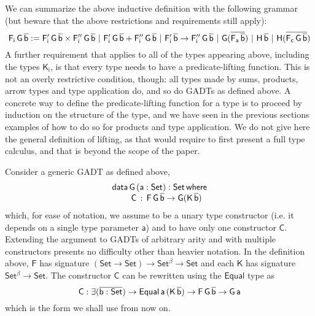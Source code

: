 \documentclass[9pt]{entcs} \usepackage{entcsmacro}
\begin{document}
We can summarize the above inductive definition with the following grammar
(but beware that the above restrictions and requirements still apply):
\[
\mathsf{F_i\,G\,\overline{b} :=
F_i'\,G\,\overline{b} \times F_i''\,G\,\overline{b}
\ \vert\ F_i'\,G\,\overline{b} + F_i''\,G\,\overline{b}
\ \vert\ F_i'\,\overline{b} \to F_i''\,G\,\overline{b}
\ \vert\ G(\overline{F_a\,\overline{b}})
\ \vert\ H\,\overline{b}
\ \vert\ H (\overline{F_c\,G\,\overline{b}})
}
\]
A further requirement that applies to all of the types appearing above,
including the types $\mathsf{K_i}$,
is that every type needs to have a predicate-lifting function.
This is not an overly restrictive condition, though:
all types made by sums, products, arrow types and type application do, and so do GADTs as defined above.
A concrete way to define the predicate-lifting function for a type is to proceed by induction on the structure of the type,
and we have seen in the previous sections examples of how to do so for products and type application.
We do not give here the general definition of lifting,
as that would require to first present a full type calculus,
and that is beyond the scope of the paper.


Consider a generic GADT as defined above,
\begin{equation}\label{eq:gadt}
\begin{array}{l}
\mathsf{data\, G\,(a : Set) : Set\,where}\\
\mathsf{\;\;\;\;\;\;\;\;C\, :\, F\,G\,\overline{b} \to G (K\,\overline{b})}
\end{array}
\end{equation}
which, for ease of notation,
we assume to be a unary type constructor (i.e. it depends on a single type parameter $\mathsf{a}$)
and to have only one constructor $\mathsf{C}$.
Extending the argument to GADTs of arbitrary arity and with multiple constructors presents no difficulty
other than heavier notation.
In the definition above, $\mathsf{F}$ has signature $\mathsf{(Set \to Set) \to Set^{\beta} \to Set}$
and each $\mathsf{K}$ has signature $\mathsf{Set^{\beta} \to Set}$.
The constructor $\mathsf{C}$ can be rewritten using the $\mathsf{Equal}$ type as
\[
\mathsf{C : \exists (\overline{b : Set}) \to Equal\,a\,(K\,\overline{b}) \to F\,G\,\overline{b} \to G\,a}
\]
which is the form we shall use from now on.
\end{document}
